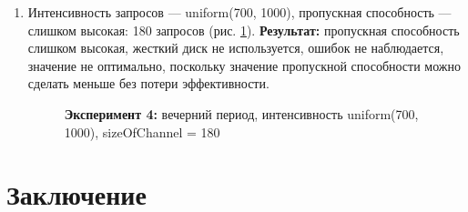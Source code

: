 \begin{itemize}
\begin{enumerate}
        \item Интенсивность запросов --- uniform(700, 1000), пропускная способность --- слишком высокая:
        180 запросов (рис. \ref{evn4}). \textbf{Результат:} пропускная способность слишком высокая, жесткий диск
        не используется, ошибок не наблюдается, значение не оптимально, поскольку значение пропускной способности
        можно сделать меньше без потери эффективности.
        \begin{figure} [h]
            \caption{\textbf{Эксперимент 4:} вечерний период, интенсивность uniform(700, 1000), sizeOfChannel = 180}
            \label{evn4}
        \end{figure}

    \end{enumerate}
\end{itemize}



\newpage
\section{Заключение}



